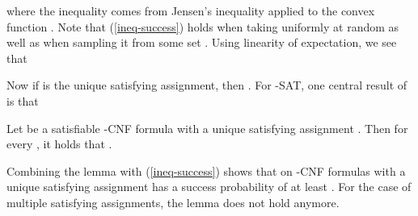where the inequality comes from Jensen's inequality applied to the
convex function . Note that (\ref{ineq-success})
holds when taking  uniformly at random as well as when sampling
it from some set . Using linearity of expectation, we see that

Now if  is the unique satisfying assignment, then . For -SAT, one central result of~\cite{ppsz} is that
\begin{lemma}
  Let  be a satisfiable -CNF formula with a unique satisfying
  assignment . Then for every , it holds that
  .
\label{lemma-unique-forced}
\end{lemma}

Combining the lemma with (\ref{ineq-success}) shows that  on
-CNF formulas with a unique satisfying assignment has a success
probability of at least . For the case of multiple satisfying assignments,
the lemma does not hold anymore.\paragraphprev

